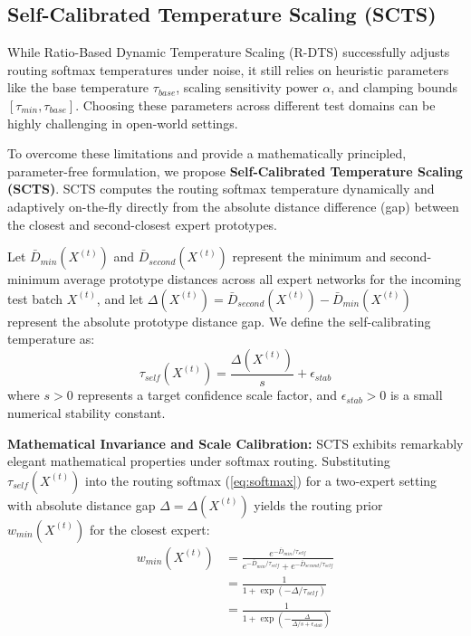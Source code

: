 \documentclass{article}
\theoremstyle{plain}
\theoremstyle{definition}
\theoremstyle{remark}
\begin{document}
\subsection{Self-Calibrated Temperature Scaling (SCTS)}

While Ratio-Based Dynamic Temperature Scaling (R-DTS) successfully adjusts routing softmax temperatures under noise, it still relies on heuristic parameters like the base temperature $\tau_{base}$, scaling sensitivity power $\alpha$, and clamping bounds $[\tau_{min}, \tau_{base}]$. Choosing these parameters across different test domains can be highly challenging in open-world settings.

To overcome these limitations and provide a mathematically principled, parameter-free formulation, we propose \textbf{Self-Calibrated Temperature Scaling (SCTS)}. SCTS computes the routing softmax temperature dynamically and adaptively on-the-fly directly from the absolute distance difference (gap) between the closest and second-closest expert prototypes.

Let $\bar{D}_{min}(X^{(t)})$ and $\bar{D}_{second}(X^{(t)})$ represent the minimum and second-minimum average prototype distances across all expert networks for the incoming test batch $X^{(t)}$, and let $\Delta(X^{(t)}) = \bar{D}_{second}(X^{(t)}) - \bar{D}_{min}(X^{(t)})$ represent the absolute prototype distance gap. We define the self-calibrating temperature as:
\begin{equation}
  \tau_{self}(X^{(t)}) = \frac{\Delta(X^{(t)})}{s} + \epsilon_{stab}
\end{equation}
where $s > 0$ represents a target confidence scale factor, and $\epsilon_{stab} > 0$ is a small numerical stability constant.

\textbf{Mathematical Invariance and Scale Calibration:}
SCTS exhibits remarkably elegant mathematical properties under softmax routing. Substituting $\tau_{self}(X^{(t)})$ into the routing softmax (\cref{eq:softmax}) for a two-expert setting with absolute distance gap $\Delta = \Delta(X^{(t)})$ yields the routing prior $w_{min}(X^{(t)})$ for the closest expert:
\begin{align}
  w_{min}(X^{(t)}) &= \frac{e^{-\bar{D}_{min} / \tau_{self}}}{e^{-\bar{D}_{min} / \tau_{self}} + e^{-\bar{D}_{second} / \tau_{self}}} \nonumber \\
  &= \frac{1}{1 + \exp\left( - \Delta / \tau_{self} \right)} \nonumber \\
  &= \frac{1}{1 + \exp\left( - \frac{\Delta}{\Delta / s + \epsilon_{stab}} \right)}
\end{align}
\end{document}

